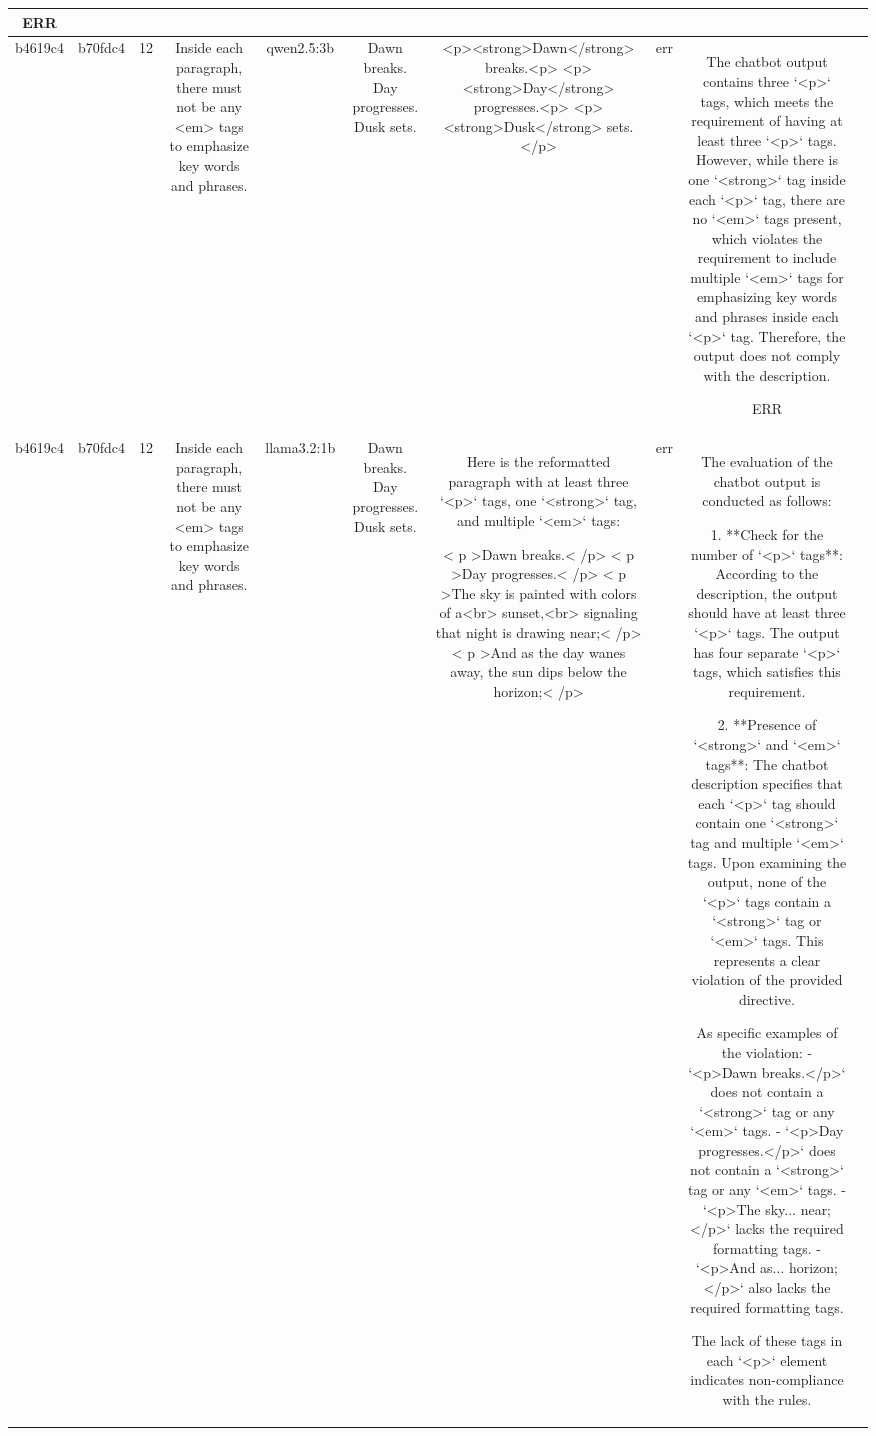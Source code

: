 \begin{table}[h!]
\begin{tabular}{|c|c|c|c|c|c|c|c|c|c|}
ERR & \\
\hline
b4619c4 & b70fdc4 & 12 & Inside each paragraph, there must not be any <em> tags to emphasize key words and phrases. & qwen2.5:3b & Dawn breaks. Day progresses. Dusk sets. & <p><strong>Dawn</strong> breaks.<p>
<p><strong>Day</strong> progresses.<p>
<p><strong>Dusk</strong> sets.</p> & err & The chatbot output contains three `<p>` tags, which meets the requirement of having at least three `<p>` tags. However, while there is one `<strong>` tag inside each `<p>` tag, there are no `<em>` tags present, which violates the requirement to include multiple `<em>` tags for emphasizing key words and phrases inside each `<p>` tag. Therefore, the output does not comply with the description.

ERR & \\
\hline
b4619c4 & b70fdc4 & 12 & Inside each paragraph, there must not be any <em> tags to emphasize key words and phrases. & llama3.2:1b & Dawn breaks. Day progresses. Dusk sets. & Here is the reformatted paragraph with at least three `<p>` tags, one `<strong>` tag, and multiple `<em>` tags:

< p >Dawn breaks.< /p>
< p >Day progresses.< /p>
< p >The sky is painted with colors of a<br> sunset,<br> signaling that night is drawing near;< /p>
< p >And as the day wanes away, the sun dips below the horizon;< /p> & err & The evaluation of the chatbot output is conducted as follows:

1. **Check for the number of `<p>` tags**: According to the description, the output should have at least three `<p>` tags. The output has four separate `<p>` tags, which satisfies this requirement.

2. **Presence of `<strong>` and `<em>` tags**: The chatbot description specifies that each `<p>` tag should contain one `<strong>` tag and multiple `<em>` tags. Upon examining the output, none of the `<p>` tags contain a `<strong>` tag or `<em>` tags. This represents a clear violation of the provided directive.

As specific examples of the violation:
- `<p>Dawn breaks.</p>` does not contain a `<strong>` tag or any `<em>` tags.
- `<p>Day progresses.</p>` does not contain a `<strong>` tag or any `<em>` tags.
- `<p>The sky... near;</p>` lacks the required formatting tags.
- `<p>And as... horizon;</p>` also lacks the required formatting tags.

The lack of these tags in each `<p>` element indicates non-compliance with the rules.


\end{tabular}
\end{table}
